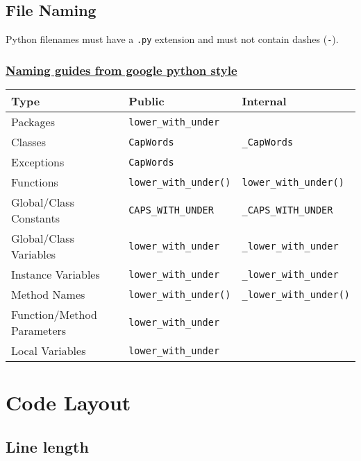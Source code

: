 \documentclass[
]{book}
\begin{document}
\hypertarget{file-naming}{%
\subsection{File Naming}\label{file-naming}}

Python filenames must have a \texttt{.py} extension and must not contain dashes (\texttt{-}).

\hypertarget{naming-guides-from-google-python-style}{%
\subsubsection{\texorpdfstring{\href{https://google.github.io/styleguide/pyguide.html\#s3.16.4-guidelines-derived-from-guidos-recommendations}{Naming guides from google python style}}{Naming guides from google python style}}\label{naming-guides-from-google-python-style}}

\begin{longtable}[]{@{}lll@{}}
\toprule
Type & Public & Internal\tabularnewline
\midrule
\endhead
Packages & \texttt{lower\_with\_under} &\tabularnewline
Classes & \texttt{CapWords} & \texttt{\_CapWords}\tabularnewline
Exceptions & \texttt{CapWords} &\tabularnewline
Functions & \texttt{lower\_with\_under()} & \texttt{lower\_with\_under()}\tabularnewline
Global/Class Constants & \texttt{CAPS\_WITH\_UNDER} & \texttt{\_CAPS\_WITH\_UNDER}\tabularnewline
Global/Class Variables & \texttt{lower\_with\_under} & \texttt{\_lower\_with\_under}\tabularnewline
Instance Variables & \texttt{lower\_with\_under} & \texttt{\_lower\_with\_under}\tabularnewline
Method Names & \texttt{lower\_with\_under()} & \texttt{\_lower\_with\_under()}\tabularnewline
Function/Method Parameters & \texttt{lower\_with\_under} &\tabularnewline
Local Variables & \texttt{lower\_with\_under} &\tabularnewline
\bottomrule
\end{longtable}

\hypertarget{code-layout}{%
\section{Code Layout}\label{code-layout}}

\hypertarget{line-length-1}{%
\subsection{Line length}\label{line-length-1}}
\end{document}
